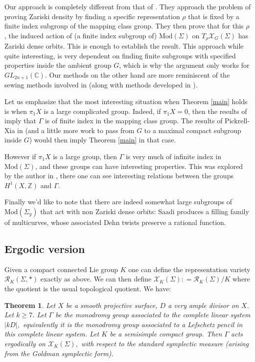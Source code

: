 \documentclass{article}
\newcommand{\XX}{\mathcal{X}}
\newcommand{\Rc}{\mathcal{R}}
\newcommand{\ZZ}{ \mathbb{Z}}
\newcommand{\CC}{\mathbb{C}}
\newcommand{\Mod}{\textrm{Mod}}
\newtheorem{theorem}{Theorem}[section]
\begin{document}
Our approach is completely different from that of \cite{KPS}. They approach the problem of proving Zariski density by finding a specific representation $\rho$ that is fixed by a finite index subgroup of the mapping class group. They then prove that for this $\rho$, the induced action of (a finite index subgroup of) $\Mod(\Sigma)$ on $T_{\rho} \XX_G(\Sigma)$ has Zariski dense orbits. This is enough to establish the result. This approach while quite interesting, is very dependent on finding finite subgroups with specified properties inside the ambient group $G$, which is why the argument only works for $GL_{2n+1}(\CC).$ Our methods on the other hand are more reminiscent of the sewing methods involved in \cite{PX} (along with methods developed in \cite{BS}). 


Let us emphasize that the most interesting situation when Theorem \ref{main} holds is when $\pi_1 X$ is a large complicated group. Indeed, if $\pi_1 X =0 $, then the results of \cite{BS} imply that $\Gamma$ is of finite index in the mapping class group. The results of Pickrell-Xia in \cite{PX} (and a little more work to pass from $G$ to a maximal compact subgroup inside $G$) would then imply Theorem \ref{main} in that case.

However if $\pi_1 X$ is a large group, then $\Gamma$ is very much of infinite index in  $\Mod(\Sigma)$, and these groups can have interesting properties. This was explored by the author in \cite{Bpi}, there one can see interesting relations between the groups $H^1(X, \ZZ)$ and $
\Gamma.$


Finally we'd like to note that there are indeed somewhat large subgroups of $\Mod(\Sigma_g)$ that act with non Zariski dense orbits: Saadi \cite{Saadi} produces a filling family of multicurves, whose associated Dehn twists  preserve a rational function.
\subsection{Ergodic version}
Given a compact connected Lie group $K$ one can define the representation variety $\Rc_K(\Sigma, *)$ exactly as above. We can then define $\XX_K(\Sigma): = \Rc_K(\Sigma) / K$ where the quotient is the usual topological quotient. We have:
\begin{theorem}\label{mainerg}
        Let $X$ be a smooth projective surface, $D$ a very ample divisor on $X$. Let $k \ge 7$. Let $\Gamma$ be the monodromy group associated to the complete linear system $|kD|,$ equivalently it is the monodromy group associated to a Lefschetz pencil in this complete linear system.
    Let $K$ be a semisimple compact group.  Then $\Gamma$ acts ergodically on $\XX_K(\Sigma),$ with respect to the standard symplectic measure (arising from the Goldman symplectic form).
\end{theorem}
\end{document}
